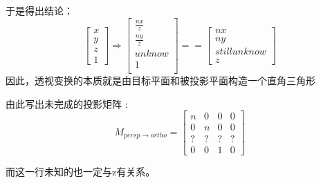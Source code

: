 \documentclass[UTF8]{ctexbook}
\begin{document}
{{{{\begin{itemize}
{\begin{itemize}
{                        于是得出结论：$$
                          \left[\begin{array}{c}
                              x \\
                              y \\
                              z \\
                              1
                            \end{array}\right]
                          \Rightarrow
                          \left[\begin{array}{c}
                              \frac{nx}{z} \\
                              \frac{ny}{z} \\
                              unknow       \\
                              1            \\
                            \end{array}\right]
                          ==
                          \left[\begin{array}{c}
                              nx           \\
                              ny           \\
                              still unknow \\
                              z
                            \end{array}\right]
                        $$
                        因此，透视变换的本质就是由目标平面和被投影平面构造一个直角三角形

                        由此写出未完成的投影矩阵 : $$
                          M_{persp \to ortho}
                          =
                          \left[\begin{matrix}
                              n & 0 & 0 & 0 \\
                              0 & n & 0 & 0 \\
                              ? & ? & ? & ? \\
                              0 & 0 & 1 & 0
                            \end{matrix}\right]
                        $$

                        而这一行未知的也一定与z有关系。

}
\end{itemize}}
\end{itemize}}}}}
\end{document}
